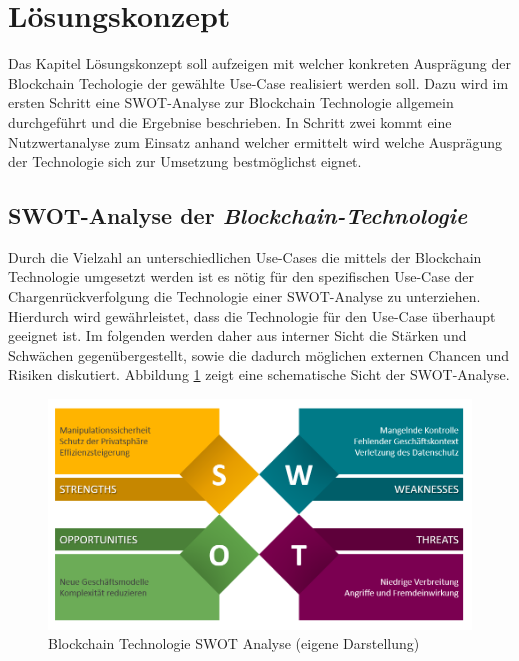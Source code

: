 \section{Lösungskonzept}
Das Kapitel Lösungskonzept soll aufzeigen mit welcher konkreten Ausprägung der Blockchain Techologie der gewählte Use-Case realisiert werden soll. Dazu wird im ersten Schritt eine SWOT-Analyse zur Blockchain Technologie allgemein durchgeführt und die Ergebnise beschrieben. In Schritt zwei kommt eine Nutzwertanalyse zum Einsatz anhand welcher ermittelt wird welche Ausprägung der Technologie sich zur Umsetzung bestmöglichst eignet.

\subsection{SWOT-Analyse der \textit{Blockchain-Technologie}}
Durch die Vielzahl an unterschiedlichen Use-Cases die mittels der Blockchain Technologie umgesetzt werden ist es nötig für den spezifischen Use-Case der Chargenrückverfolgung die Technologie einer SWOT-Analyse zu unterziehen. Hierdurch wird gewährleistet, dass die Technologie für den Use-Case überhaupt geeignet ist. Im folgenden werden daher aus interner Sicht die Stärken und Schwächen gegenübergestellt, sowie die dadurch möglichen externen Chancen und Risiken diskutiert. Abbildung \ref{fig:blockchain-technology-swot-analysis} zeigt eine schematische Sicht der SWOT-Analyse.

\begin{figure}[H]
	\centering
	\includegraphics[width=1\linewidth]{pictures/blockchain-technology-swot-analysis}
	\caption[Blockchain Technologie SWOT Analyse]{Blockchain Technologie SWOT Analyse (eigene Darstellung)}
	\label{fig:blockchain-technology-swot-analysis}
\end{figure}

